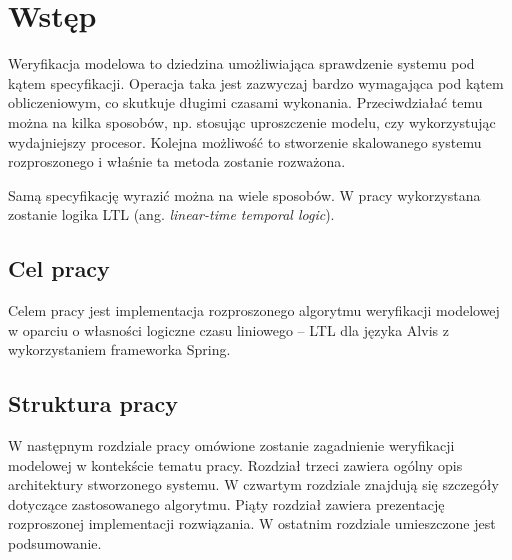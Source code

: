 \chapter{Wstęp}

Weryfikacja modelowa to dziedzina umożliwiająca sprawdzenie systemu pod kątem specyfikacji.
Operacja taka jest zazwyczaj bardzo wymagająca pod kątem obliczeniowym, co skutkuje długimi czasami wykonania. Przeciwdziałać temu można na kilka sposobów, np. stosując uproszczenie modelu, czy wykorzystując wydajniejszy procesor. Kolejna możliwość to stworzenie skalowanego systemu rozproszonego i właśnie ta metoda zostanie rozważona.

Samą specyfikację wyrazić można na wiele sposobów. W pracy wykorzystana zostanie logika LTL (ang. \textit{linear-time temporal logic}).


\section{Cel pracy}

Celem pracy jest implementacja rozproszonego algorytmu weryfikacji modelowej w oparciu o własności logiczne czasu liniowego -- LTL dla języka Alvis z wykorzystaniem frameworka Spring.


\section{Struktura pracy}

W następnym rozdziale pracy omówione zostanie zagadnienie weryfikacji modelowej w kontekście tematu pracy.
Rozdział trzeci zawiera ogólny opis architektury stworzonego systemu.
W czwartym rozdziale znajdują się szczegóły dotyczące zastosowanego algorytmu.
Piąty rozdział zawiera prezentację rozproszonej implementacji rozwiązania.
W ostatnim rozdziale umieszczone jest podsumowanie.
